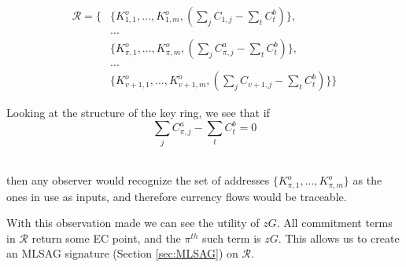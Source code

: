 \begin{align*}
  \mathcal{R} = \{ &\{K_{1,1}^o,...,K_{1,m}^o, (\sum\limits_j C_{1, j} - \sum\limits_t C^b_{t})\}, \\
  &... \\
  &\{K_{\pi,1}^o,...,K_{\pi,m}^o, (\sum\limits_j C^a_{\pi, j} - \sum\limits_t C^b_{t})\}, \\
  &... \\
  &\{K_{v+1,1}^o,...,K_{v+1,m}^o, (\sum\limits_j C_{v+1, j} - \sum\limits_t C^b_{t})\}\}
\end{align*}

Looking at the structure of the key ring, we see that if \vspace{.2cm}
\[\sum\limits_j C^a_{\pi, j} -\sum\limits_t C^b_{t} = 0\] \\\vspace{-.7cm}

then any observer would recognize the set of addresses
$\{K_{\pi,1}^o,...,K_{\pi,m}^o\}$
as the ones in use as inputs, and therefore currency flows would be traceable.

With this observation made we can see the utility of $z G$. All commitment terms in $\mathcal{R}$ return some EC point, and the $\pi^{th}$ such term is $z G$. This allows us to create an MLSAG signature (Section \ref{sec:MLSAG}) on $\mathcal{R}$.


